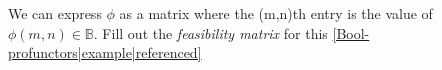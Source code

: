 
We can express $\phi$ as a matrix where the (m,n)th entry is the value of $\phi(m,n) \in \mathbb{B}$. Fill out the \emph{feasibility matrix} for this \ref{Bool-profunctors|example|referenced}
